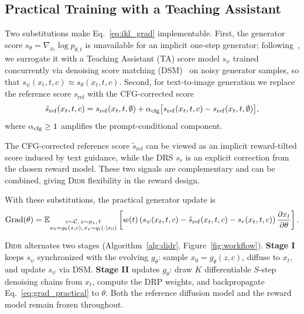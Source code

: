 \subsection{Practical Training with a Teaching Assistant}
\label{subsec:algorithm}
\vspace{-3mm}
Two substitutions make Eq.~\eqref{eq:ikl_grad} implementable. First, the generator score $s_\theta = \nabla_{x_t}\log p_{\theta,t}$ is unavailable for an implicit one-step generator; following~\citet{Luo2023DiffInstructAU}, we surrogate it with a Teaching Assistant (TA) score model $s_\psi$ trained concurrently via denoising score matching (DSM)~\citep{vincent2011connection,song2021scorebased} on noisy generator samples, so that $s_\psi(x_t,t,c)\approx s_\theta(x_t,t,c)$. Second, for text-to-image generation we replace the reference score $s_{\mathrm{ref}}$ with the CFG-corrected score
\begin{equation}
\tilde{s}_{\mathrm{ref}}(x_t, t, c) = s_{\mathrm{ref}}(x_t, t, \emptyset) + \alpha_{\mathrm{cfg}} \bigl[ s_{\mathrm{ref}}(x_t, t, c) - s_{\mathrm{ref}}(x_t, t, \emptyset) \bigr],
\label{eq:cfg}
\end{equation}
where $\alpha_{\mathrm{cfg}}\geq 1$ amplifies the prompt-conditional component.

\begin{remark}
The CFG-corrected reference score $\tilde{s}_{\mathrm{ref}}$ can be viewed as an implicit reward-tilted score induced by text guidance, while the DRS $s_r$ is an explicit correction from the chosen reward model. These two signals are complementary and can be combined, giving \textsc{Didr} flexibility in the reward design.
\end{remark}

With these substitutions, the practical generator update is
\begin{equation}
\operatorname{Grad}(\theta)
=
\mathbb{E}_{\substack{c\sim\mathcal{C},\,z\sim p_z,\,t\\
x_0=g_\theta(z,c),\,x_t\sim q_t(\cdot|x_0)}}
\left[
w(t)
\left(
s_\psi(x_t,t,c)
-
\tilde{s}_{\mathrm{ref}}(x_t,t,c)
-
s_r(x_t,t,c)
\right)
\frac{\partial x_t}{\partial\theta}
\right].
\label{eq:grad_practical}
\end{equation}

\textsc{Didr} alternates two stages (Algorithm~\ref{alg:didr}, Figure~\ref{fig:workflow}). \textbf{Stage I} keeps $s_\psi$ synchronized with the evolving $g_\theta$: sample $x_0 = g_\theta(z,c)$, diffuse to $x_t$, and update $s_\psi$ via DSM. \textbf{Stage II} updates $g_\theta$: draw $K$ differentiable $S$-step denoising chains from $x_t$, compute the DRP weights, and backpropagate Eq.~\eqref{eq:grad_practical} to $\theta$. Both the reference diffusion model and the reward model remain frozen throughout.

\vspace{-3mm}
